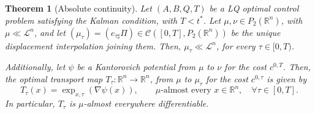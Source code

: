 \documentclass[reqno]{amsart}
\theoremstyle{plain}
\newtheorem{thm}{Theorem}[section]
\theoremstyle{definition}
\theoremstyle{remark}
\begin{document}
	\begin{thm}[Absolute continuity]\label{absolute_continuity-dyn_opt_coupl}
      Let $(A,B,Q,T)$ be a LQ optimal control problem satisfying the Kalman condition, with $T<t^*$. Let $\mu, \nu\in P_2(\mathbb{R}^n)$, with $\mu\ll\mathscr{L}^n$, and let $(\mu_\tau)=(e_{\tau\sharp}\Pi)\in\mathcal{C}([0,T],P_2(\mathbb{R}^n))$ be the unique displacement interpolation joining them. Then, $\mu_\tau\ll\mathscr{L}^n$, for every $\tau\in[0,T)$. 

        Additionally, let $\psi$ be a Kantorovich potential from $\mu$ to $\nu$ for the cost $c^{0,T}$. Then, the optimal transport map $T_\tau:\mathbb{R}^n\to\mathbb{R}^n$, from $\mu$ to $\mu_\tau$ for the cost $c^{0,\tau}$ is given by
        \begin{equation}
			T_\tau(x)=\exp_{x,\tau}(\nabla\psi(x)),\qquad\mu\text{-almost every }x\in\mathbb{R}^n, \quad\forall \tau\in[0,T].
		\end{equation}
        In particular, $T_\tau$ is $\mu$-almost everywhere differentiable.
	\end{thm}
\end{document}
